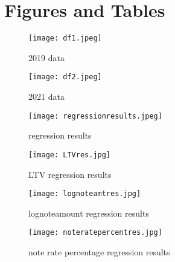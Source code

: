 \documentclass[12pt,english]{article}
\begin{document}
\vfill
\pagebreak{}
\clearpage

\section*{Figures and Tables}\label{sec:figTables}

\begin{figure}
\centering
\texttt{[image: df1.jpeg]}
\caption{\label{fig:df1}2019 data}
\end{figure}

\begin{figure}
\centering
\texttt{[image: df2.jpeg]}
\caption{\label{fig:df2}2021 data}
\end{figure}

\begin{figure}
\centering
\texttt{[image: regressionresults.jpeg]}
\caption{\label{fig:results} regression results}
\end{figure}

\begin{figure}
\centering
\texttt{[image: LTVres.jpg]}
\caption{\label{fig:LTVres}LTV regression results}
\end{figure}

\begin{figure}
\centering
\texttt{[image: lognoteamtres.jpg]}
\caption{\label{fig:lognoteamount regression results}lognoteamount regression results}
\end{figure}

\begin{figure}
\centering
\texttt{[image: noteratepercentres.jpg]}
\caption{\label{fig:note rate percentage regression results} note rate percentage regression results}
\end{figure}
\end{document}
